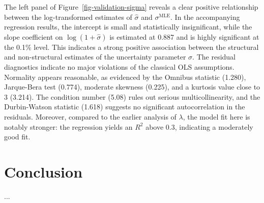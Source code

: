 \documentclass[mnsc]{informs3}
\begin{document}
The left panel of Figure~\ref{fig-validation-sigma} reveals a clear positive relationship between the log-transformed estimates of $\hat{\sigma}$ and $\sigma^{\text{MLE}}$. 
In the accompanying regression results, the intercept is small and statistically insignificant, while the slope coefficient on $\log(1 + \hat{\sigma})$ is estimated at 0.887 and is highly significant at the 0.1\% level. 
This indicates a strong positive association between the structural and non-structural estimates of the uncertainty parameter $\sigma$.
The residual diagnostics indicate no major violations of the classical OLS assumptions. 
Normality appears reasonable, as evidenced by the Omnibus statistic (1.280), Jarque-Bera test (0.774), moderate skewness (0.225), and a kurtosis value close to 3 (3.214). 
The condition number (5.08) rules out serious multicollinearity, and the Durbin-Watson statistic (1.618) suggests no significant autocorrelation in the residuals.
Moreover, compared to the earlier analysis of $\lambda$, the model fit here is notably stronger: the regression yields an $R^2$ above 0.3, indicating a moderately good fit. 


\section{Conclusion}

...

%
%
%
\end{document}
